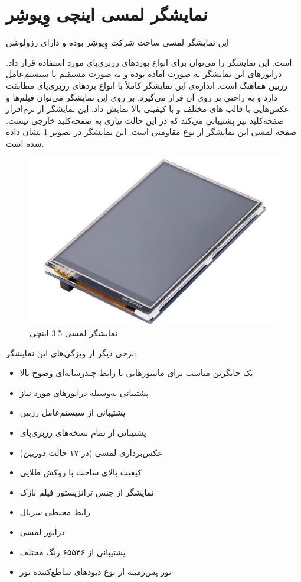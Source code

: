 \section{نمایشگر لمسی  اینچی وِیوشِر}
این نمایشگر لمسی ساخت شرکت وِیوشِر بوده و دارای رزولوشن  { است. این نمایشگر را می‌توان برای انواع بوردهای رزبری‌پای مورد استفاده قرار داد. درایورهای این نمایشگر به صورت آماده بوده و به صورت مستقیم با  سیستم‌عامل رزبین هماهنگ است. اندازه‌ی این نمایشگر کاملاً با انواع بردهای رزبری‌پای مطابقت دارد و به راحتی بر روی آن قرار می‌گیرد. بر روی این نمایشگر می‌توان فیلم‌ها و عکس‌هایی با قالب‌ های مختلف و با کیفیتی بالا نمایش داد. این نمایشگر از نرم‌افزار صفحه‌کلید نیز پشتیبانی می‌کند که در این حالت نیازی به صفحه‌کلید خارجی نیست. صفحه لمسی این نمایشگر از نوع مقاومتی است. این نمایشگر در تصویر \ref{lcd} نشان داده شده است.

\begin{figure}[t!]
    \centering
    \includegraphics[scale=0.30]{figures/lcd.png}
    \caption{نمایشگر لمسی 3.5 اینچی}
    \label{lcd}
\end{figure}
\clearpage
برخی دیگر از ویژگی‌های این نمایشگر:

\begin{itemize}
	\item  یک جایگزین مناسب برای مانیتورهایی با رابط چندرسانه‌ای وضوح بالا
	\item پشتیبانی به‌وسیله درایورهای مورد نیاز
	\item پشتیبانی از سیستم‌عامل رزبین
	\item پشتیبانی از تمام نسخه‌های رزبری‌پای
	\item عکس‌برداری لمسی (در ۱۷ حالت دوربین)
	\item کیفیت بالای ساخت با روکش طلایی
	\item نمایشگر از جنس ترانزیستور فیلم نازک 
	\item رابط محیطی سریال 
	\item درایور لمسی 
	\item پشتیبانی از ۶۵۵۳۶ رنگ مختلف
	\item نور پس‌زمینه از نوع دیود‌های ساطع‌کننده نور 
\end{itemize}


}
